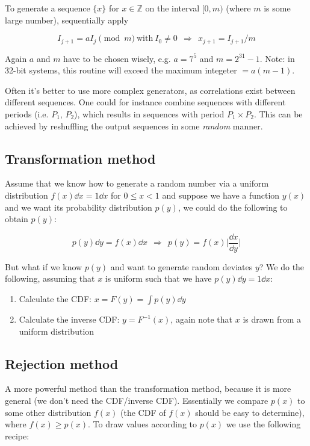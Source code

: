 \documentclass[a4paper]{article}
\newcommand{\Z}{\mathbb{Z}}
\begin{document}
To generate a sequence $\{x\}$ for $x\in\Z$ on the interval $[0, m)$ (where $m$ is some large number), sequentially apply

\begin{equation*}
    I_{j+1}=aI_j \pmod{m}\ \text{with}\ I_0\not=0\ \ \Rightarrow\ \ x_{j+1}=I_{j+1}/m
\end{equation*}

Again $a$ and $m$ have to be chosen wisely, e.g. $a=7^5$ and $m=2^{31}-1$. Note: in 32-bit systems, this routine will exceed the maximum integeter $=a(m-1)$.

\bigskip

Often it's better to use more complex generators, as correlations exist between different sequences. One could for instance combine sequences with different periods (i.e. $P_1$, $P_2$), which results in sequences with period $P_1\times P_2$. This can be achieved by reshuffling the output sequences in some \textit{random} manner.

\subsection{Transformation method}
Assume that we know how to generate a random number via a uniform distribution $f(x)\dd{x}=1\dd{x}$ for $0\le x < 1$ and suppose we have a function $y(x)$ and we want its probability distribution $p(y)$, we could do the following to obtain $p(y)$:

\begin{equation*}
    p(y)\dd{y}=f(x)\dd{x}\ \ \Rightarrow\ \ p(y)=f(x)\bigg|\frac{\dd{x}}{\dd{y}}\bigg|
\end{equation*}

But what if we know $p(y)$ and want to generate random deviates $y$? We do the following, assuming that $x$ is uniform such that we have $p(y)\dd{y}=1\dd{x}$: 

\begin{enumerate}
    \item Calculate the CDF: $x=F(y)=\int p(y)\dd{y}$
    \item Calculate the inverse CDF: $y=F^{-1}(x)$, again note that $x$ is drawn from a uniform distribution
\end{enumerate}

\subsection{Rejection method}

A more powerful method than the transformation method, because it is more general (we don't need the CDF/inverse CDF). Essentially we compare $p(x)$ to some other distribution $f(x)$ (the CDF of $f(x)$ should be easy to determine), where $f(x)\ge p(x)$. To draw values according to $p(x)$ we use the following recipe:
\end{document}
